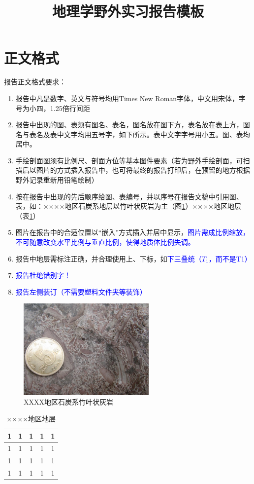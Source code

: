 \documentclass{fieldpractice-geo}
\title{地理学野外实习报告模板}
\begin{document}
	\maketitle

\section{正文格式}
报告正文格式要求：
\begin{enumerate}
	\item 报告中凡是数字、英文与符号均用Times New Roman字体，中文用宋体，字号为小四，1.25倍行间距
	\item 报告中出现的图、表须有图名、表名，图名放在图下方，表名放在表上方，图名与表名及表中文字均用五号字，如下所示。表中文字字号用小五。图、表均居中。
	\item 手绘剖面图须有比例尺、剖面方位等基本图件要素（若为野外手绘剖面，可扫描后以图片的方式插入报告中，也可将最终的报告打印后，在预留的地方根据野外记录重新用铅笔绘制）
	\item 按在报告中出现的先后顺序给图、表编号，并以序号在报告文稿中引用图、表，如：××××地区石炭系地层以竹叶状灰岩为主（图\ref{fig:XXXX地区石炭系竹叶状灰岩}）××××地区地层（表\ref{tab:××××地区地层}）
	\item 图片在报告中的合适位置以“嵌入”方式插入并居中显示，\textcolor{blue}{图片需成比例缩放，不可随意改变水平比例与垂直比例，使得地质体比例失调。}
	\item 报告中地层需标注正确，并合理使用上、下标，如\textcolor{blue}{下三叠统（$T_1$，而不是T1）}
	\item \textcolor{blue}{报告杜绝错别字！}
	\item \textcolor{blue}{报告左侧装订（不需要塑料文件夹等装饰）}
\end{enumerate}
\begin{figure}[ht]
	\centering
	\includegraphics[width=0.6\textwidth]{figures/XXXX地区石炭系竹叶状灰岩.jpg}
	\caption{XXXX地区石炭系竹叶状灰岩}
	\label{fig:XXXX地区石炭系竹叶状灰岩}
\end{figure}
\begin{table}[htbp]
	\centering
	\caption{××××地区地层}
	\begin{tabular}{ccccc}
		\toprule
		1 &  1     & 1      &  1     & 1 \\
		\midrule
		1 & 1      & 1      &  1     & 1 \\
		1 & 1      & 1      &  1     & 1 \\
		1 & 1      & 1      &  1     & 1 \\
		\bottomrule
	\end{tabular}%
	\label{tab:××××地区地层}%
\end{table}%
\end{document}
